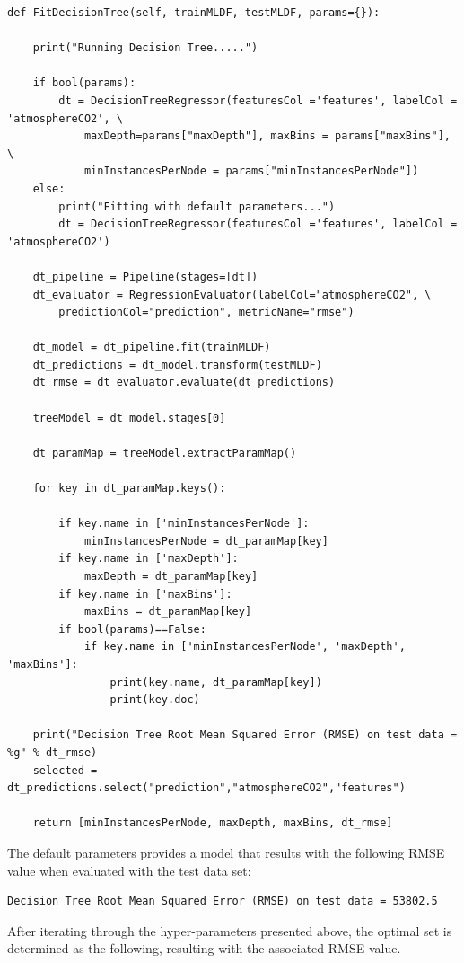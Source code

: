 \documentclass[11pt,a4paper,titlepage]{article}
\begin{document}
\begin{verbatim}
def FitDecisionTree(self, trainMLDF, testMLDF, params={}):

    print("Running Decision Tree.....")

    if bool(params):
        dt = DecisionTreeRegressor(featuresCol ='features', labelCol = 'atmosphereCO2', \
            maxDepth=params["maxDepth"], maxBins = params["maxBins"], \
            minInstancesPerNode = params["minInstancesPerNode"])
    else:
        print("Fitting with default parameters...")
        dt = DecisionTreeRegressor(featuresCol ='features', labelCol = 'atmosphereCO2')

    dt_pipeline = Pipeline(stages=[dt])
    dt_evaluator = RegressionEvaluator(labelCol="atmosphereCO2", \
        predictionCol="prediction", metricName="rmse")

    dt_model = dt_pipeline.fit(trainMLDF)
    dt_predictions = dt_model.transform(testMLDF)
    dt_rmse = dt_evaluator.evaluate(dt_predictions)

    treeModel = dt_model.stages[0]

    dt_paramMap = treeModel.extractParamMap()

    for key in dt_paramMap.keys():

        if key.name in ['minInstancesPerNode']:
            minInstancesPerNode = dt_paramMap[key]
        if key.name in ['maxDepth']:
            maxDepth = dt_paramMap[key]
        if key.name in ['maxBins']:
            maxBins = dt_paramMap[key]
        if bool(params)==False:
            if key.name in ['minInstancesPerNode', 'maxDepth', 'maxBins']:
                print(key.name, dt_paramMap[key])
                print(key.doc)

    print("Decision Tree Root Mean Squared Error (RMSE) on test data = %g" % dt_rmse)
    selected = dt_predictions.select("prediction","atmosphereCO2","features")

    return [minInstancesPerNode, maxDepth, maxBins, dt_rmse]
\end{verbatim}

The default parameters provides a model that results with the following RMSE value when evaluated with the test data set:

\begin{verbatim}
Decision Tree Root Mean Squared Error (RMSE) on test data = 53802.5
\end{verbatim}

After iterating through the hyper-parameters presented above, the optimal set is determined as the following, resulting with the associated RMSE value.
\end{document}
